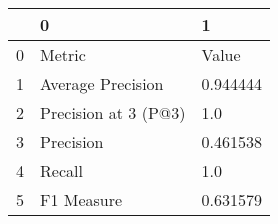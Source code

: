 \begin{tabular}{lll}
\toprule
{} &                     0 &         1 \\
\midrule
0 &                Metric &     Value \\
1 &     Average Precision &  0.944444 \\
2 &  Precision at 3 (P@3) &       1.0 \\
3 &             Precision &  0.461538 \\
4 &                Recall &       1.0 \\
5 &            F1 Measure &  0.631579 \\
\bottomrule
\end{tabular}
